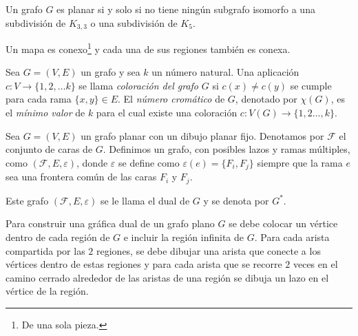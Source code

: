 \documentclass[3p,times,a4paper,twocolumn,authoryear]{elsarticle} %
\begin{document}
\begin{theorem}

Un grafo $G$ es planar si y solo si no tiene ningún subgrafo isomorfo a una subdivisión de $K_{3,3}$ o una subdivisión de $K_5$.

\end{theorem}

\begin{definition}

Un mapa es conexo\footnote{De una sola pieza.} y cada una de sus regiones también es conexa.

\end{definition}

\begin{definition}

Sea $G=(V,E)$ un grafo y sea $k$ un número natural. Una aplicación $c\colon V\to \{1,2,\ldots k\}$ se llama \emph{\color{DarkBlue}coloración del grafo} $G$ si $c(x)\neq c(y)$ se cumple para cada rama $\{x,y\}\in E$. \linebreak El \emph{\color{DarkBlue}número cromático} de $G$, denotado por $\chi(G)$, es el \emph{\color{red}mínimo valor} de $k$ para el cual existe una coloración $c\colon V(G)\to\{1,2\ldots,k\}$.

\end{definition}

\begin{definition}

Sea $G=(V,E)$ un grafo planar con un dibujo planar fijo. Denotamos por $\mathcal{F}$ el conjunto de caras de $G$. Definimos un grafo, con posibles lazos y ramas múltiples, como $(\mathcal{F},E,\varepsilon)$, donde $\varepsilon$ se define como $\varepsilon(e)=\{F_i,F_j\}$ siempre que la rama $e$ sea una frontera común de las caras $F_i$ y $F_j$.

Este grafo $\left(\mathcal{F},E,\varepsilon\right)$ se le llama el dual de $G$ y se denota por $G^{\ast}$.
	
\end{definition}

\begin{example}

Para construir una gráfica dual de un grafo plano $G$ se debe colocar un vértice dentro de cada región de $G$ e incluir la región infinita de $G$. Para cada arista compartida por las $2$ regiones, se debe dibujar una arista que conecte a los vértices dentro de estas regiones y para cada arista que se recorre $2$ veces en el camino cerrado alrededor de las aristas de una región se dibuja un lazo en el vértice de la región.

\end{example}
\end{document}
